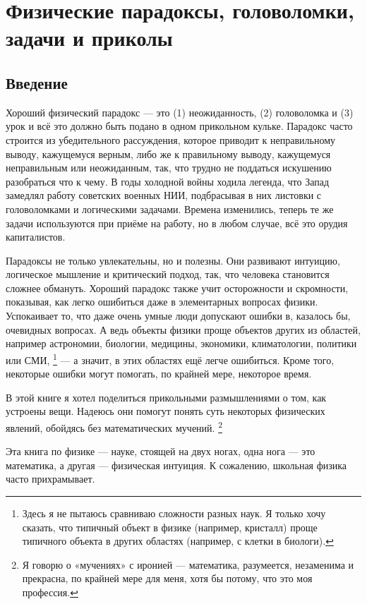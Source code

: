 \chapter[Парадоксы, головоломки, задачи]{Физические парадоксы, головоломки, задачи и приколы}

\section{Введение}

Хороший физический парадокс --- это (1) неожиданность, (2) головоломка и (3) урок и всё это должно быть подано в одном прикольном кульке.
Парадокс часто строится из убедительного рассуждения, которое приводит к неправильному выводу, кажущемуся верным, либо же к правильному выводу, кажущемуся неправильным или неожиданным,
так, что трудно не поддаться искушению разобраться что к чему.
В годы холодной войны ходила легенда, что Запад замедлял работу советских военных НИИ, подбрасывая в них листовки с головоломками и логическими задачами.
Времена изменились, теперь те же задачи используются при приёме на работу, но в любом случае, всё это орудия капиталистов.

Парадоксы не только увлекательны, но и полезны.
Они развивают интуицию, логическое мышление и критический подход, так, что
человека становится сложнее обмануть.
Хороший парадокс также учит осторожности и скромности, показывая, как легко ошибиться даже в элементарных вопросах физики.
Успокаивает то, что даже очень умные люди допускают ошибки в, казалось бы, очевидных вопросах.
А ведь объекты физики проще объектов других из областей, например астрономии, биологии, медицины, экономики, климатологии, политики или СМИ,%
\footnote{Здесь я не пытаюсь сравниваю сложности разных наук.
Я только хочу сказать, что типичный объект в физике (например, кристалл) проще типичного объекта в других областях (например, с клетки в биологи).} — а значит, в этих областях ещё легче ошибиться.
Кроме того, некоторые ошибки могут помогать, по крайней мере, некоторое время.

В этой книге я хотел поделиться прикольными размышлениями о том, как устроены вещи.
Надеюсь они помогут понять суть некоторых физических явлений, обойдясь без математических мучений.%
\footnote{Я говорю о «мучениях» с иронией --- математика, разумеется, незаменима и прекрасна, по крайней мере для меня, хотя бы потому, что это моя профессия.}

Эта книга по физике — науке, стоящей на двух ногах, одна нога --- это математика, а другая --- физическая интуиция.
К сожалению, школьная физика часто прихрамывает.

